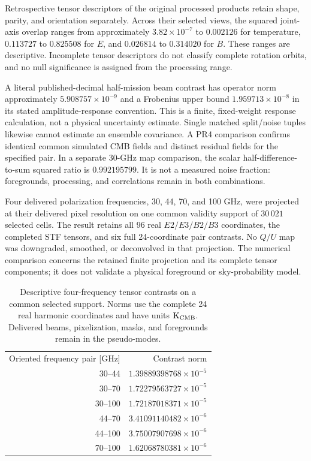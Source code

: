 Retrospective tensor descriptors of the original processed products retain shape, parity, and orientation separately. Across their selected views, the squared joint-axis overlap ranges from approximately $3.82\times10^{-7}$ to $0.002126$ for temperature, $0.113727$ to $0.825508$ for $E$, and $0.026814$ to $0.314020$ for $B$. These ranges are descriptive. Incomplete tensor descriptors do not classify complete rotation orbits, and no null significance is assigned from the processing range.

A literal published-decimal half-mission beam contrast has operator norm approximately $5.908757\times10^{-9}$ and a Frobenius upper bound $1.959713\times10^{-8}$ in its stated amplitude-response convention. This is a finite, fixed-weight response calculation, not a physical uncertainty estimate. Single matched split/noise tuples likewise cannot estimate an ensemble covariance. A PR4 comparison confirms identical common simulated CMB fields and distinct residual fields for the specified pair. In a separate 30-GHz map comparison, the scalar half-difference-to-sum squared ratio is $0.992195799$. It is not a measured noise fraction: foregrounds, processing, and correlations remain in both combinations.

Four delivered polarization frequencies, 30, 44, 70, and 100 GHz, were projected at their delivered pixel resolution on one common validity support of $30\,021$ selected cells. The result retains all 96 real $E2/E3/B2/B3$ coordinates, the completed STF tensors, and six full 24-coordinate pair contrasts. No $Q/U$ map was downgraded, smoothed, or deconvolved in that projection. The numerical comparison concerns the retained finite projection and its complete tensor components; it does not validate a physical foreground or sky-probability model.

\begin{table}[ht]
\caption{Descriptive four-frequency tensor contrasts on a common selected support. Norms use the complete 24 real harmonic coordinates and have units $\mathrm K_{\rm CMB}$. Delivered beams, pixelization, masks, and foregrounds remain in the pseudo-modes.}
\label{tab:frequency}
\begin{ruledtabular}\begin{tabular}{rr}
Oriented frequency pair [GHz]&Contrast norm\\
30--44&$1.39889398768\times10^{-5}$\\
30--70&$1.72279563727\times10^{-5}$\\
30--100&$1.72187018371\times10^{-5}$\\
44--70&$3.41091140482\times10^{-6}$\\
44--100&$3.75007907698\times10^{-6}$\\
70--100&$1.62068780381\times10^{-6}$
\end{tabular}\end{ruledtabular}
\end{table}

